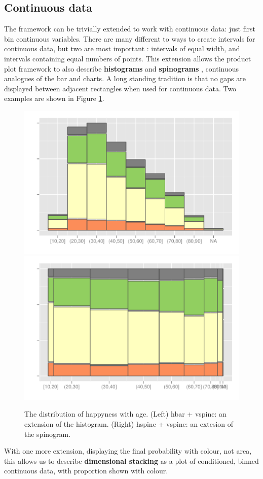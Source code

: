 \documentclass[journal]{vgtc}
\begin{document}
\subsection{Continuous data}
\label{sub:continuous_data}

The framework can be trivially extended to work with continuous data: just first bin continuous variables. There are many different to ways to create intervals for continuous data, but two are most important \citep{denby:2009}: intervals of equal width, and intervals containing equal numbers of points. This extension allows the product plot framework to also describe {\bf histograms} and {\bf spinograms} \citep{hummel:1996}, continuous analogues of the bar and charts. A long standing tradition is that no gaps are displayed between adjacent rectangles when used for continuous data. Two examples are shown in Figure \ref{fig:cont-examples}.

\begin{figure}[htbp]
  \centering
  \includegraphics[width=0.5\linewidth]{cont-hbar}%
  \includegraphics[width=0.5\linewidth]{cont-hspine}
  
  \caption{The distribution of happyness with age. (Left) hbar + vspine: an extension of the histogram. (Right) hspine + vspine: an extesion of the spinogram.}
  \label{fig:cont-examples}
\end{figure}

With one more extension, displaying the final probability with colour, not area, this allows us to describe {\bf dimensional stacking} \citep{leblanc:1990} as a plot of conditioned, binned continuous data, with proportion shown with colour. 
\end{document}
